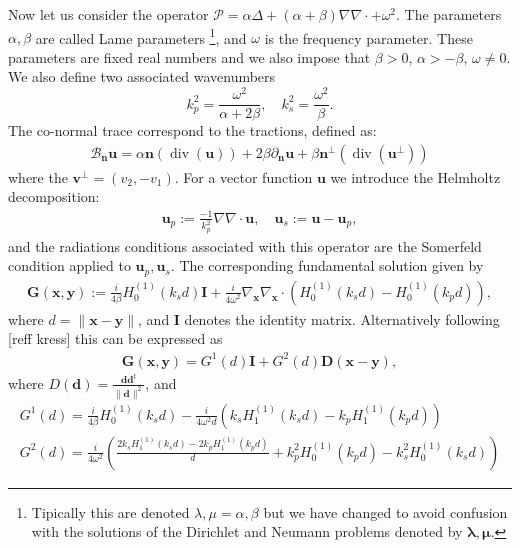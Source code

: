 \documentclass{article}
\renewcommand{\div}{\operatorname{div}}
\newcommand{\todo}[1]{{\color{red}[#1]}}
\newcommand{\bmu} {\bm{\mu}}
\renewcommand{\div}{{\rm div}}
\renewcommand{\div}{\operatorname{div}}
\newcommand{\cP}{\mathcal{P}}
\newcommand{\bla}{\boldsymbol \lambda}
\newcommand{\bn}{\bm{n}}
\newcommand{\bu}{\bm{u}}
\newcommand{\bx}{\bm{x}}
\newcommand{\by}{\bm{y}}
\begin{document}
Now let us consider the operator $\cP = \alpha \Delta + (\alpha + \beta) \nabla \nabla \cdot + \omega^2$. The parameters $\alpha,\beta$ are called Lame parameters \footnote{Tipically this are denoted $\lambda, \mu = \alpha, \beta$ but we have changed to avoid confusion with the solutions of the Dirichlet and Neumann problems denoted by $\bla, \bmu$.}, and $\omega$ is the frequency parameter. These parameters are  fixed real numbers and we also impose that  $\beta > 0$, $\alpha > - \beta$, $\omega \neq 0$. We also define two associated wavenumbers $$
k_p^2 = \frac{\omega^2}{\alpha+2\beta}, \quad
k_s^2 = \frac{\omega^2}{\beta}.$$  
The co-normal trace correspond to the tractions, defined as: 
\begin{align*}
\mathcal{B}_{\bn} \mathbf{u} =
\alpha \mathbf{n} (\div(\mathbf{u}))
+ 2 \beta \partial_{\mathbf{n}} \mathbf{u}+
\beta  \mathbf{n}^\perp (\div(\mathbf{u}^\perp))
\end{align*}
where the $\mathbf{v}^\perp  = (v_2,-v_1)$. For a vector function $\bu$ we introduce the Helmholtz decomposition: 
\begin{align*}
\mathbf{u}_p := \frac{-1}{k^2_p}\nabla \nabla \cdot \mathbf{u}, \quad
\mathbf{u}_s := \mathbf{u} - \mathbf{u}_p,
\end{align*} 
and the radiations conditions associated with this operator are the Somerfeld condition applied to $\bu_p, \bu_s$. 
The corresponding fundamental solution given by 
\begin{align}
\label{eq:efunsol}
\mathbf{G} (\mathbf{x}, \mathbf{y}) := 
\frac{i}{4 \beta} H^{(1)}_0(k_s d)\mathbf{I}+ \frac{i}{4\omega^2} \nabla_\mathbf{x} 
\nabla_\mathbf{x} \cdot \left( 
H^{(1)}_0(k_sd ) - H^{(1)}_0(k_p d)
\right),
\end{align}
where $d = \| \bx -\by\|$, and $\mathbf{I}$ denotes the identity matrix. Alternatively following \todo{reff kress} this can be expressed as 
\begin{align*}
\mathbf{G}(\mathbf{x},\mathbf{y})  = G^1(d) \mathbf{I} + 
{G}^2(d)\mathbf{D}(\mathbf{x}-\mathbf{y}),
\end{align*}
where  $D(\mathbf{d}) = \frac{\mathbf{d} \mathbf{d}^t}{\|\mathbf{d}\|^2}$, and 
\begin{align*}
G^1(d) = \frac{i}{4\beta} H_{0}^{(1)}(k_s d) - \frac{i}{4\omega^2d}(k_s H_1^{(1)}(k_s d)- k_p H_1^{(1)}(k_p d)) \\
G^2(d) = \frac{i}{4\omega^2} \left( 
\frac{2k_s H^{(1)}_1(k_s d)-2k_p H^{(1)}_1(k_p d)}{d}+
k_p^2H^{(1)}_0(k_p d)- k_s^2H^{(1)}_0(k_s d)  
\right)
\end{align*}
\end{document}
